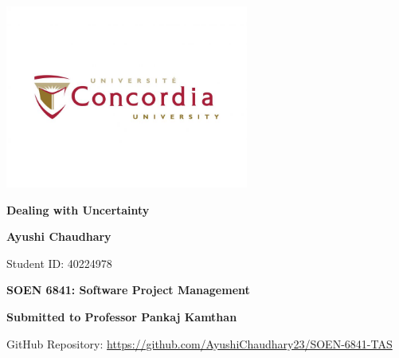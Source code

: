 \documentclass{article}
\begin{document}
\begin{titlepage}
    \centering
    \vspace*{1cm}
    \includegraphics[width=0.6\textwidth]{Logo.jpg} %
    \par\vspace{0.5cm}
    {\Huge\textbf{Dealing with Uncertainty}\par}
    \vspace{1.5cm}
    {\Large\textbf{Ayushi Chaudhary}\par}
    \vspace{0.5cm}
    {Student ID: 40224978\par}
    \vspace{2cm}
    {\Large\textbf{SOEN 6841: Software Project Management}\par}
    \vspace{1cm}
    {\large\textbf{Submitted to Professor Pankaj Kamthan}\par}
    \vfill
    GitHub Repository: \url{https://github.com/AyushiChaudhary23/SOEN-6841-TAS}
    \vfill
\end{titlepage}

\newpage
\tableofcontents
\newpage
{}
\end{document}
